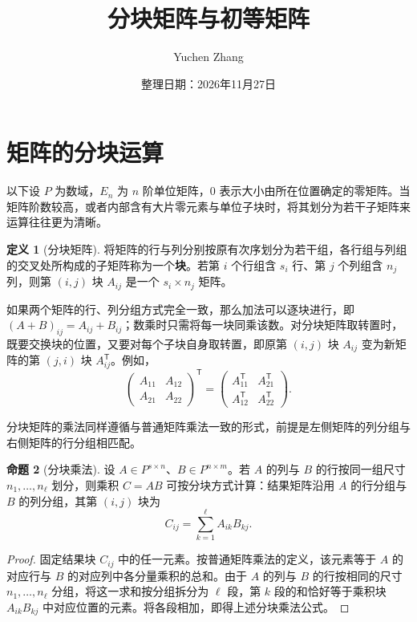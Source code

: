 \documentclass[UTF8, fontset=fandol, a4paper, 12pt]{ctexart}
\title{分块矩阵与初等矩阵}
\author{Yuchen Zhang}
\date{整理日期：2026年11月27日}
\makeatletter
\theoremstyle{definition}
\newtheorem{definition}{定义}[section]
\newtheorem{proposition}[definition]{命题}
\renewcommand{\maketitle}{%
  \begin{center}
    {\LARGE\bfseries\@title\par}\vspace{0.6em}
    \@author\par\vspace{0.2em}
    {\small\@date\par}
  \end{center}
}
\makeatother
\begin{document}
\maketitle

\section{矩阵的分块运算}

以下设 $P$ 为数域，$E_n$ 为 $n$ 阶单位矩阵，$0$ 表示大小由所在位置确定的零矩阵。当矩阵阶数较高，或者内部含有大片零元素与单位子块时，将其划分为若干子矩阵来运算往往更为清晰。

\begin{definition}[分块矩阵]
将矩阵的行与列分别按原有次序划分为若干组，各行组与列组的交叉处所构成的子矩阵称为一个\textbf{块}。若第 $i$ 个行组含 $s_i$ 行、第 $j$ 个列组含 $n_j$ 列，则第 $(i,j)$ 块 $A_{ij}$ 是一个 $s_i\times n_j$ 矩阵。
\end{definition}

如果两个矩阵的行、列分组方式完全一致，那么加法可以逐块进行，即 $(A+B)_{ij}=A_{ij}+B_{ij}$；数乘时只需将每一块同乘该数。对分块矩阵取转置时，既要交换块的位置，又要对每个子块自身取转置，即原第 $(i,j)$ 块 $A_{ij}$ 变为新矩阵的第 $(j,i)$ 块 $A_{ij}^{\mathsf T}$。例如，
\[
 \begin{pmatrix} A_{11} & A_{12} \\ A_{21} & A_{22} \end{pmatrix}^{\mathsf T}
 =\begin{pmatrix}
   A_{11}^{\mathsf T} & A_{21}^{\mathsf T} \\
   A_{12}^{\mathsf T} & A_{22}^{\mathsf T}
 \end{pmatrix}.
\]

分块矩阵的乘法同样遵循与普通矩阵乘法一致的形式，前提是左侧矩阵的列分组与右侧矩阵的行分组相匹配。

\begin{proposition}[分块乘法]
设 $A\in P^{s\times n}$、$B\in P^{n\times m}$。若 $A$ 的列与 $B$ 的行按同一组尺寸 $n_1,\ldots,n_\ell$ 划分，则乘积 $C=AB$ 可按分块方式计算：结果矩阵沿用 $A$ 的行分组与 $B$ 的列分组，其第 $(i,j)$ 块为
\[
 C_{ij}=\sum_{k=1}^{\ell} A_{ik}B_{kj}.
\]
\end{proposition}
\begin{proof}
固定结果块 $C_{ij}$ 中的任一元素。按普通矩阵乘法的定义，该元素等于 $A$ 的对应行与 $B$ 的对应列中各分量乘积的总和。由于 $A$ 的列与 $B$ 的行按相同的尺寸 $n_1,\ldots,n_\ell$ 分组，将这一求和按分组拆分为 $\ell$ 段，第 $k$ 段的和恰好等于乘积块 $A_{ik}B_{kj}$ 中对应位置的元素。将各段相加，即得上述分块乘法公式。
\end{proof}
\end{document}
